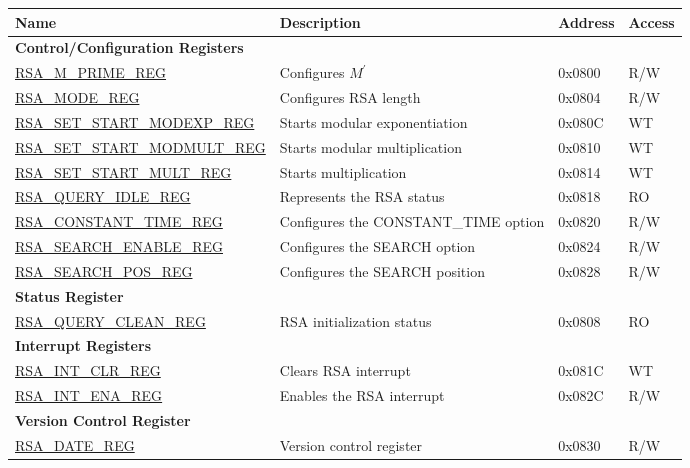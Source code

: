 \begin{longtable}{ | p{6cm} | p{7.2cm} | p{1.3cm} | p{1cm} | }
\hline\rowcolor{lightgray}
\textbf{Name} & \textbf{Description} &  \textbf{Address} & \textbf{Access} \\ \hline
\endhead
\multicolumn{4}{|l|}{\textbf{Control/Configuration Registers}} \\ \hline
\hyperref[regdesc:RSAMPRIMEREG]{RSA\_M\_PRIME\_REG} & Configures \begin{math}M^{\prime}\end{math} & 0x0800 & R/W \\ \hline
\hyperref[regdesc:RSAMODEREG]{RSA\_MODE\_REG} & Configures RSA length & 0x0804 & R/W \\ \hline
\hyperref[regdesc:RSASETSTARTMODEXPREG]{RSA\_SET\_START\_MODEXP\_REG} & Starts modular exponentiation & 0x080C & WT \\ \hline
\hyperref[regdesc:RSASETSTARTMODMULTREG]{RSA\_SET\_START\_MODMULT\_REG} & Starts modular multiplication & 0x0810 & WT \\ \hline
\hyperref[regdesc:RSASETSTARTMULTREG]{RSA\_SET\_START\_MULT\_REG} & Starts multiplication & 0x0814 & WT \\ \hline
\hyperref[regdesc:RSAQUERYIDLEREG]{RSA\_QUERY\_IDLE\_REG} & Represents the RSA status & 0x0818 & RO \\ \hline
\hyperref[regdesc:RSACONSTANTTIMEREG]{RSA\_CONSTANT\_TIME\_REG} & Configures the CONSTANT\_TIME option & 0x0820 & R/W \\ \hline
\hyperref[regdesc:RSASEARCHENABLEREG]{RSA\_SEARCH\_ENABLE\_REG} & Configures the SEARCH option & 0x0824 & R/W \\ \hline
\hyperref[regdesc:RSASEARCHPOSREG]{RSA\_SEARCH\_POS\_REG} & Configures the SEARCH position & 0x0828 & R/W \\ \hline
\multicolumn{4}{|l|}{\textbf{Status Register}} \\ \hline
\hyperref[regdesc:RSAQUERYCLEANREG]{RSA\_QUERY\_CLEAN\_REG} & RSA initialization status & 0x0808 & RO \\ \hline
\multicolumn{4}{|l|}{\textbf{Interrupt Registers}} \\ \hline
\hyperref[regdesc:RSAINTCLRREG]{RSA\_INT\_CLR\_REG} & Clears RSA interrupt & 0x081C & WT \\ \hline
\hyperref[regdesc:RSAINTENAREG]{RSA\_INT\_ENA\_REG} & Enables the RSA interrupt & 0x082C & R/W \\ \hline
\multicolumn{4}{|l|}{\textbf{Version Control Register}} \\ \hline
\hyperref[regdesc:RSADATEREG]{RSA\_DATE\_REG} & Version control register & 0x0830 & R/W \\ \hline
\end{longtable}
